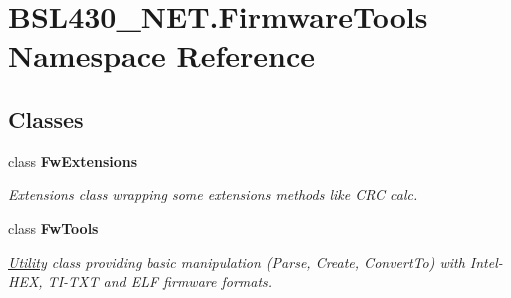 \hypertarget{namespace_b_s_l430___n_e_t_1_1_firmware_tools}{}\section{B\+S\+L430\+\_\+\+N\+E\+T.\+Firmware\+Tools Namespace Reference}
\label{namespace_b_s_l430___n_e_t_1_1_firmware_tools}
\subsection*{Classes}
\begin{DoxyCompactItemize}
\item 
class {\bfseries Fw\+Extensions}
\begin{DoxyCompactList}\small\item\em Extensions class wrapping some extensions methods like C\+RC calc. \end{DoxyCompactList}\item 
class {\bfseries Fw\+Tools}
\begin{DoxyCompactList}\small\item\em \mbox{\hyperlink{namespace_b_s_l430___n_e_t_1_1_utility}{Utility}} class providing basic manipulation (Parse, Create, Convert\+To) with Intel-\/\+H\+EX, T\+I-\/\+T\+XT and E\+LF firmware formats. \end{DoxyCompactList}\end{DoxyCompactItemize}
